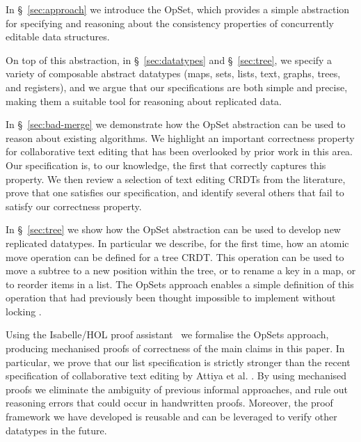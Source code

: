 \documentclass[a4paper,english]{lipics-v2018}
\begin{document}
\begin{itemize*}
\item In \S~\ref{sec:approach} we introduce the OpSet, which provides a simple abstraction for specifying and reasoning about the consistency properties of concurrently editable data structures.

\item On top of this abstraction, in \S~\ref{sec:datatypes} and \S~\ref{sec:tree}, we specify a variety of composable abstract datatypes (maps, sets, lists, text, graphs, trees, and registers), and we argue that our specifications are both simple and precise, making them a suitable tool for reasoning about replicated data.

\item In \S~\ref{sec:bad-merge} we demonstrate how the OpSet abstraction can be used to reason about existing algorithms.
We highlight an important correctness property for collaborative text editing that has been overlooked by prior work in this area.
Our specification is, to our knowledge, the first that correctly captures this property.
We then review a selection of text editing CRDTs from the literature, prove that one satisfies our specification, and identify several others that fail to satisfy our correctness property.

\item In \S~\ref{sec:tree} we show how the OpSet abstraction can be used to develop new replicated datatypes. In particular we describe, for the first time, how an atomic move operation can be defined for a tree CRDT.
This operation can be used to move a subtree to a new position within the tree, or to rename a key in a map, or to reorder items in a list.
The OpSets approach enables a simple definition of this operation that had previously been thought impossible to implement without locking \cite{Najafzadeh:2017vk,Najafzadeh:2018bw}.

\item Using the Isabelle/HOL proof assistant~\cite{DBLP:conf/tphol/WenzelPN08} we formalise the OpSets approach, producing mechanised proofs of correctness of the main claims in this paper.
In particular, we prove that our list specification is strictly stronger than the recent specification of collaborative text editing by Attiya et al. \cite{Attiya:2016kh}.
By using mechanised proofs we eliminate the ambiguity of previous informal approaches, and rule out reasoning errors that could occur in handwritten proofs.
Moreover, the proof framework we have developed is reusable and can be leveraged to verify other datatypes in the future.
\end{itemize*}
\end{document}
